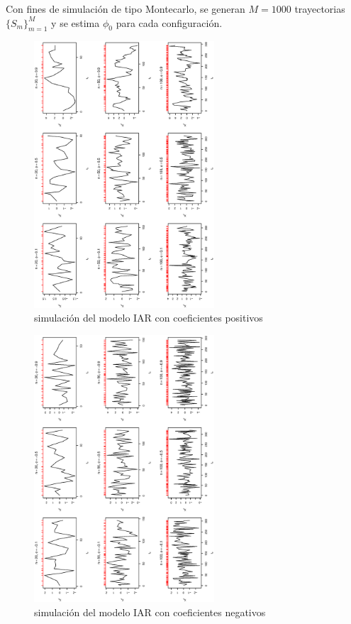 Con fines de simulación de tipo Montecarlo, se generan $M=1000$ trayectorias $\lbrace S_m\rbrace_{m=1}^M$ y se estima $\phi_0$ para cada configuración.
\begin{figure}[h]
    \includegraphics[width=0.6\textwidth, angle = 270]{Kap3/Fig_Cap3/sim1.eps}
    \caption{simulación del modelo IAR con coeficientes positivos}
    \label{fig:sim1}
\end{figure}

\begin{figure}[h]
    \includegraphics[width=0.6\textwidth, angle = 270]{Kap3/Fig_Cap3/sim22.eps}
    \caption{simulación del modelo IAR con coeficientes negativos}
    \label{fig:sim2}
\end{figure}

